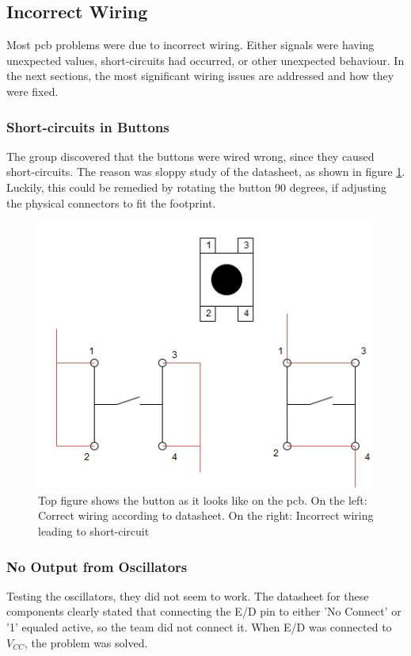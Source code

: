 \subsection{Incorrect Wiring}
Most \gls{pcb} problems were due to incorrect wiring. 
Either signals were having unexpected values, short-circuits had occurred, or other unexpected behaviour. 
In the next sections, the most significant wiring issues are addressed and how they were fixed.

\subsubsection{Short-circuits in Buttons}
The group discovered that the buttons were wired wrong, since they caused short-circuits. 
The reason was sloppy study of the datasheet, as shown in figure \ref{fig:Button Issue}. 
Luckily, this could be remedied by rotating the button 90 degrees, if adjusting the physical connectors to fit the footprint.

\begin{figure}[h!]
\centering
\includegraphics[scale=0.5]{images/Button_Issue.png}
\caption{Top figure shows the button as it looks like on the \gls{pcb}. On the left: Correct wiring according to datasheet. On the right: Incorrect wiring leading to short-circuit}
\label{fig:Button Issue}
\end{figure}

\subsubsection{No Output from Oscillators}
Testing the oscillators, they did not seem to work. 
The datasheet for these components clearly stated that connecting the E/D pin to either 'No Connect' or '1' equaled active, so the team did not connect it. 
When E/D was connected to \(V_{CC}\), the problem was solved.

